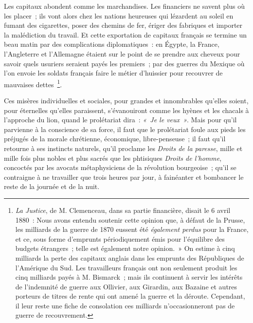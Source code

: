 \documentclass[french,twoside]{book} %
\begin{document}
Les capitaux abondent comme les marchandises. Les financiers ne savent plus où les placer ; ils vont alors chez les nations heureuses qui lézardent au soleil en fumant des cigarettes, poser des chemins de fer, ériger des fabriques et importer la malédiction du travail. Et cette exportation de capitaux français se termine un beau matin par des complications diplomatiques : en Égypte, la France, l’Angleterre et l’Allemagne étaient sur le point de se prendre aux cheveux pour savoir quels usuriers seraient payés les premiers ; par des guerres du Mexique où l’on envoie les soldats français faire le métier d’huissier pour recouvrer de mauvaises dettes \footnote{\emph{La Justice}, de M. Clemenceau, dans sa partie financière, disait le 6 avril 1880 : Nous avons entendu soutenir cette opinion que, à défaut de la Prusse, les milliards de la guerre de 1870 eussent été \emph{également perdus} pour la France, et ce, sous forme d’emprunts périodiquement émis pour l’équilibre des budgets étrangers ; telle est également notre opinion. » On estime à cinq milliards la perte des capitaux anglais dans les emprunts des Républiques de l’Amérique du Sud. Les travailleurs français ont non seulement produit les cinq milliards payés à M. Bismarck ; mais ils continuent à servir les intérêts de l’indemnité de guerre aux Ollivier, aux Girardin, aux Bazaine et autres porteurs de titres de rente qui ont amené la guerre et la déroute. Cependant, il leur reste une fiche de consolation ces milliards n’occasionneront pas de guerre de recouvrement.}.\par
Ces misères individuelles et sociales, pour grandes et innombrables qu’elles soient, pour éternelles qu’elles paraissent, s’évanouiront comme les hyènes et les chacals à l’approche du lion, quand le prolétariat dira : \emph{« Je le veux »}. Mais pour qu’il parvienne à la conscience de sa force, il faut que le prolétariat foule aux pieds les préjugés de la morale chrétienne, économique, libre-penseuse ; il faut qu’il retourne à ses instincts naturels, qu’il proclame les \emph{Droits de la paresse}, mille et mille fois plus nobles et plus sacrés que les phtisiques \emph{Droits de l’homme}, concoctés par les avocats métaphysiciens de la révolution bourgeoise ; qu’il se contraigne à ne travailler que trois heures par jour, à fainéanter et bombancer le reste de la journée et de la nuit.\par
\end{document}
